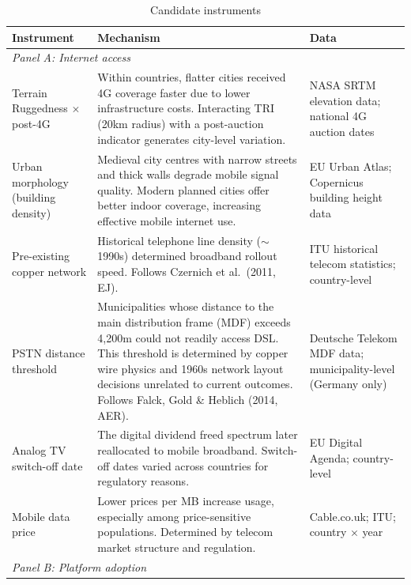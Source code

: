 \documentclass[12pt, a4paper]{article}
\begin{document}
\begin{table}[H]
\centering
\footnotesize
\caption{Candidate instruments}
\label{tab:instruments}
\begin{tabular}{p{3.2cm} p{6.5cm} p{3.8cm}}
\hline\hline
\textbf{Instrument} & \textbf{Mechanism} & \textbf{Data} \\
\hline
\multicolumn{3}{l}{\textit{Panel A: Internet access}} \\[3pt]

Terrain Ruggedness $\times$ post-4G & 
Within countries, flatter cities received 4G 
coverage faster due to lower infrastructure costs. 
Interacting TRI (20km radius) with a post-auction 
indicator generates city-level variation. & 
NASA SRTM elevation data; national 4G auction dates \\[6pt]

Urban morphology (building density) & 
Medieval city centres with narrow streets and thick 
walls degrade mobile signal quality. Modern planned 
cities offer better indoor coverage, increasing 
effective mobile internet use. & 
EU Urban Atlas; Copernicus building height data \\[6pt]

Pre-existing copper network & 
Historical telephone line density 
($\sim$1990s) determined broadband rollout 
speed. Follows Czernich et al.\ (2011, EJ). & 
ITU historical telecom statistics; country-level \\[6pt]

PSTN distance threshold &
Municipalities whose distance to the main distribution
frame (MDF) exceeds 4,200m could not readily access DSL.
This threshold is determined by copper wire physics and
1960s network layout decisions unrelated to current
outcomes. Follows Falck, Gold \& Heblich (2014, AER). &
Deutsche Telekom MDF data; municipality-level (Germany only) \\[6pt]

Analog TV switch-off date & 
The digital dividend freed spectrum later 
reallocated to mobile broadband. Switch-off 
dates varied across countries for regulatory 
reasons. & 
EU Digital Agenda; country-level \\[6pt]

Mobile data price & 
Lower prices per MB increase usage, especially 
among price-sensitive populations. Determined 
by telecom market structure and regulation. & 
Cable.co.uk; ITU; country $\times$ year \\[6pt]

\hline
\multicolumn{3}{l}{\textit{Panel B: Platform adoption}} \\[3pt]


\end{tabular}
\end{table}
\end{document}
